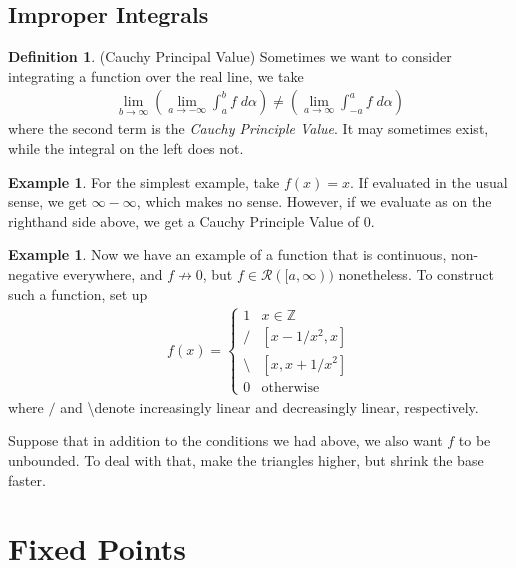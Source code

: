 \documentclass[12pt]{article}
\numberwithin{equation}{section} %
\theoremstyle{plain}
\theoremstyle{definition}
\newtheorem{defn}[thm]{Definition}
\newtheorem{ex}[thm]{Example}
\theoremstyle{remark}
\begin{document}
\newpage
\subsection{Improper Integrals}

\begin{defn}(Cauchy Principal Value)
Sometimes we want to consider integrating a function over the real line,
we take
\begin{align*}
    \lim_{b\rightarrow\infty}
    \left(\lim_{a\rightarrow-\infty} \int^b_a f\;d\alpha
    \right) \neq
    \left(\lim_{a\rightarrow\infty} \int^a_{-a} f\;d\alpha
    \right)
\end{align*}
where the second term is the \emph{Cauchy Principle Value}. It may
sometimes exist, while the integral on the left does not.
\end{defn}

\begin{ex}
For the simplest example, take $f(x)=x$. If evaluated in the usual
sense, we get $\infty-\infty$, which makes no sense. However, if we
evaluate as on the righthand side above, we get a Cauchy Principle Value
of $0$.
\end{ex}

\begin{ex}
Now we have an example of a function that is continuous, non-negative
everywhere, and $f\not\rightarrow 0$, but $f\in\mathscr{R}([a,\infty))$
nonetheless.  To construct such a function, set up
\begin{align*}
  f(x) =
  \begin{cases}
      1 & x\in\mathbb{Z} \\
      / & [x - 1/x^2, x] \\
      \text{\textbackslash} & [x, x + 1/x^2] \\
      0 & \text{otherwise}
  \end{cases}
\end{align*}
where $/$ and \textbackslash denote increasingly linear and decreasingly
linear, respectively.

Suppose that in addition to the conditions we had above, we also want
$f$ to be unbounded. To deal with that, make the triangles higher, but
shrink the base faster.
\end{ex}



\clearpage
\section{Fixed Points}
\end{document}
